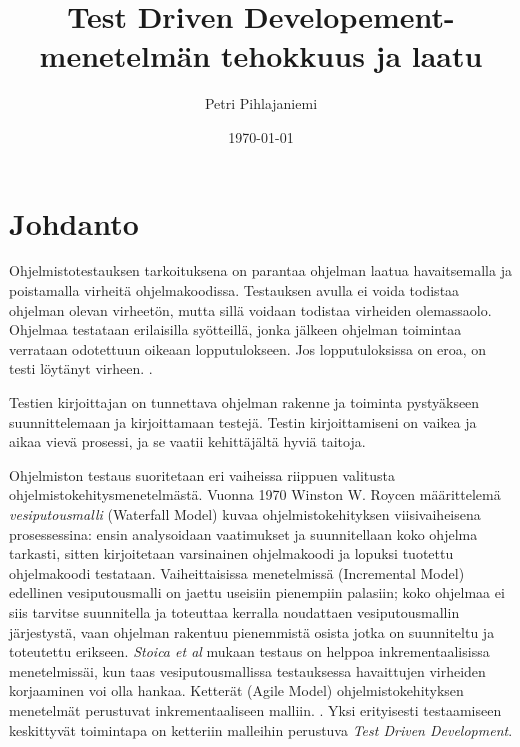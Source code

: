 \documentclass[finnish]{tktltiki2}
\title{Test Driven Developement-menetelmän tehokkuus ja laatu}
\author{Petri Pihlajaniemi}
\date{\today}
\theoremstyle{definition}
\theoremstyle{remark}
\begin{document}


\maketitle        %
\makeabstract     %

\tableofcontents  %


\mainmatter       %




\section{Johdanto}


Ohjelmistotestauksen tarkoituksena on parantaa ohjelman laatua havaitsemalla ja poistamalla virheitä ohjelmakoodissa. Testauksen avulla ei voida todistaa ohjelman olevan virheetön, mutta sillä voidaan todistaa virheiden olemassaolo. Ohjelmaa testataan erilaisilla syötteillä, jonka jälkeen ohjelman toimintaa verrataan odotettuun oikeaan lopputulokseen. Jos lopputuloksissa on eroa, on testi löytänyt virheen.   \cite{Muccini08}.


Testien kirjoittajan on tunnettava ohjelman rakenne ja toiminta pystyäkseen suunnittelemaan ja kirjoittamaan testejä. Testin kirjoittamiseni on vaikea ja aikaa vievä prosessi, ja se vaatii kehittäjältä hyviä taitoja. \cite{Whittaker00}

Ohjelmiston testaus suoritetaan eri vaiheissa riippuen valitusta ohjelmistokehitysmenetelmästä. Vuonna 1970 Winston W. Roycen määrittelemä \emph{vesiputousmalli} (Waterfall Model) kuvaa ohjelmistokehityksen viisivaiheisena prosessessina: ensin analysoidaan vaatimukset ja suunnitellaan koko ohjelma tarkasti, sitten kirjoitetaan varsinainen ohjelmakoodi ja lopuksi tuotettu ohjelmakoodi testataan. Vaiheittaisissa menetelmissä (Incremental Model) edellinen vesiputousmalli on jaettu useisiin pienempiin palasiin; koko ohjelmaa ei siis tarvitse suunnitella ja toteuttaa kerralla noudattaen vesiputousmallin järjestystä, vaan ohjelman rakentuu pienemmistä osista jotka on suunniteltu ja toteutettu erikseen. \emph{Stoica et al} mukaan testaus on helppoa inkrementaalisissa menetelmissäi, kun taas vesiputousmallissa testauksessa havaittujen virheiden korjaaminen voi olla hankaa. Ketterät (Agile Model) ohjelmistokehityksen menetelmät perustuvat inkrementaaliseen malliin. \cite{Stoica13}. Yksi erityisesti testaamiseen keskittyvät toimintapa on ketteriin malleihin perustuva \emph{Test Driven Development}. \cite{Crispin06}
\end{document}
